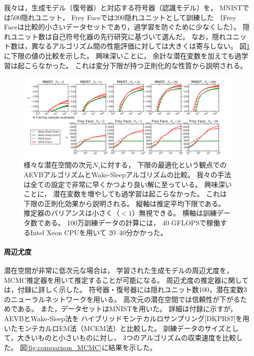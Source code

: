 \documentclass[dvipdfmx, fleqn]{jsarticle}
\begin{document}
我々は，生成モデル（復号器）と対応する符号器（認識モデル）を，
MNISTでは500隠れユニット，
Frey Faceでは200隠れユニットとして訓練した
（Frey Faceは比較的小さいデータセットであり，過学習を防ぐために少なくした）。
隠れユニット数は自己符号化器の先行研究に基づいて選んだ。
なお，隠れユニット数は，異なるアルゴリズム間の性能評価に対しては大きくは寄与しない。
図\ref{fig:comparison_WakeSleep}に下限の値の比較を示した。
興味深いことに，
余計な潜在変数を加えても過学習は起こらなかった。
これは変分下限が持つ正則化的な性質から説明される。

\begin{figure}
    \centering
    \includegraphics[clip, width=15cm]{../figures/comparison_WakeSleep}
    \caption{
        様々な潜在空間の次元\(N_z\)に対する，
        下限の最適化という観点での
        AEVBアルゴリズムとWake-Sleepアルゴリズムの比較。
        我々の手法は全ての設定で非常に早くかつより良い解に至っている。
        興味深いことに，
        潜在変数を増やしても過学習は起こらなかった。
        これは下限の正則化効果から説明される。
        縦軸は推定平均下限である。
        推定器のバリアンスは小さく（\(< 1\)）無視できる。
        横軸は訓練データ数である。
        100万訓練データの計算には，
        40 GFLOPSで稼働するIntel Xeon CPUを用いて
        20--40分かかった。
        }
    \label{fig:comparison_WakeSleep}
\end{figure}


\paragraph{周辺尤度}

潜在空間が非常に低次元な場合は，
学習された生成モデルの周辺尤度を，
MCMC推定器を用いて推定することが可能になる。
周辺尤度の推定器に関しては，付録に詳しく示した。
符号器・復号器には隠れユニット数100，潜在変数3のニューラルネットワークを用いる。
高次元の潜在空間では信頼性が下がるためである。
また，データセットはMNISTを用いた。
詳細は付録に示すが，
AEVBとWake-Sleep法を
ハイブリッドモンテカルロサンプリング[DKPR87]を用いたモンテカルロEM法（MCEM法）と比較した。
訓練データのサイズとして，大きいものと小さいものに対し，
3つのアルゴリズムの収束速度を比較した。
図\ref{fig:comparison_MCMC}に結果を示した。
\end{document}
